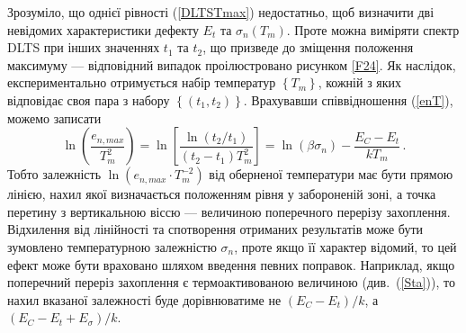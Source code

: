 Зрозуміло, що однієї рівності (\ref{DLTSTmax}) недостатньо,
щоб визначити дві невідомих характеристики дефекту $E_t$ та $\sigma_n(T_m)$.
Проте можна виміряти спектр DLTS при інших значеннях $t_1$ та $t_2$,
що призведе до зміщення положення максимуму --- відповідний випадок проілюстровано рисунком \ref{F24}.
Як наслідок, експериментально отримується набір температур $\left\{T_{m}\right\}$,
кожній з яких відповідає своя пара з набору  $\left\{(t_{1},t_{2})\right\}$.
Врахувавши співвідношення (\ref{enT}), можемо записати
\begin{equation}
\label{DLTSenT}
\ln\left(\frac{e_{n,max}}{T_m^2}\right)=\ln\left[\frac{\ln\left(t_2/t_1\right)}{\left(t_2-t_1\right)T_m^2}\right]=\ln\left(\beta\sigma_n\right)-\frac{E_C-E_t}{kT_m}\,.
\end{equation}
Тобто залежність $\ln(e_{n,max}\cdot T_m^{-2})$ від оберненої температури має бути прямою лінією,
нахил якої визначається положенням рівня у забороненій зоні, а точка перетину з вертикальною віссю ---
величиною поперечного перерізу захоплення.
Відхилення від лінійності та спотворення отриманих результатів може бути зумовлено температурною залежністю
$\sigma_n$, проте якщо її характер відомий, то цей ефект може бути враховано шляхом введення певних поправок.
Наприклад, якщо поперечний переріз захоплення є термоактивованою величиною (див.~(\ref{Sta})),
то нахил вказаної залежності буде дорівнюватиме не $(E_C-E_t)/k$, а $(E_C-E_t+E_{\sigma})/k$.




